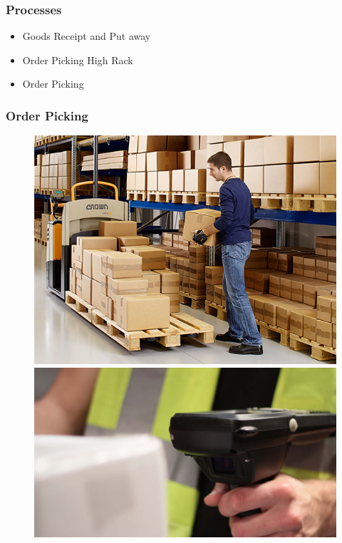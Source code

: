 \begin{frame}\frametitle{Processes}
	\begin{itemize}
		\item Goods Receipt and Put away
		\item Order Picking High Rack
		\item Order Picking
	\end{itemize}
\end{frame}
\begin{frame}\frametitle{Order Picking}
	\begin{figure}
		\begin{minipage}{0.45\linewidth}
			\centering
			\includegraphics[width=.95\linewidth,left]{images/emea-quickpick-remote-revolutionise}
		\end{minipage}
		\begin{minipage}{0.45\linewidth}
			\centering
			\includegraphics[width=.95\linewidth,right]{images/kstorewmsimage}
		\end{minipage}
	\end{figure}
\end{frame}

